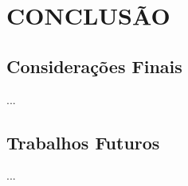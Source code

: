 \chapter{CONCLUSÃO}
\label{chap:conclusao}

\section{Considerações Finais}
...

\section{Trabalhos Futuros}
...
